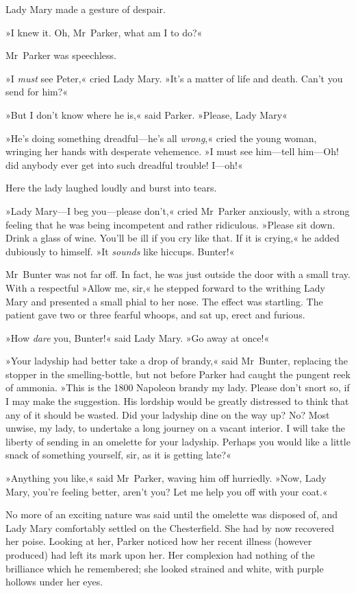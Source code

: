 Lady Mary made a gesture of despair.

»I knew it. Oh, Mr~Parker, what am I to do?«

Mr~Parker was speechless.

»I \textit{must} see Peter,« cried Lady Mary. »It's a matter of life and death. Can't you send for him?«

»But I don't know where he is,« said Parker. »Please, Lady Mary\longdash«

»He's doing something dreadful—he's all \textit{wrong},« cried the young woman, wringing her hands with desperate vehemence. »I must see him—tell him—Oh! did anybody ever get into such dreadful trouble! I—oh!\longdash«

Here the lady laughed loudly and burst into tears.

»Lady Mary—I beg you—please don't,« cried Mr~Parker anxiously, with a strong feeling that he was being incompetent and rather ridiculous.  »Please sit down. Drink a glass of wine. You'll be ill if you cry like that. If it is crying,« he added dubiously to himself. »It \textit{sounds} like hiccups. Bunter!«

Mr~Bunter was not far off. In fact, he was just outside the door with a small tray. With a respectful »Allow me, sir,« he stepped forward to the writhing Lady Mary and presented a small phial to her nose. The effect was startling. The patient gave two or three fearful whoops, and sat up, erect and furious.

»How \textit{dare} you, Bunter!« said Lady Mary. »Go away at once!«

»Your ladyship had better take a drop of brandy,« said Mr~Bunter, replacing the stopper in the smelling-bottle, but not before Parker had caught the pungent reek of ammonia. »This is the 1800 Napoleon brandy my lady. Please don't snort so, if I may make the suggestion.  His lordship would be greatly distressed to think that any of it should be wasted. Did your ladyship dine on the way up? No? Most unwise, my lady, to undertake a long journey on a vacant interior. I will take the liberty of sending in an omelette for your ladyship. Perhaps you would like a little snack of something yourself, sir, as it is getting late?«

»Anything you like,« said Mr~Parker, waving him off hurriedly. »Now, Lady Mary, you're feeling better, aren't you? Let me help you off with your coat.«

No more of an exciting nature was said until the omelette was disposed of, and Lady Mary comfortably settled on the Chesterfield. She had by now recovered her poise. Looking at her, Parker noticed how her recent illness (however produced) had left its mark upon her. Her complexion had nothing of the brilliance which he remembered; she looked strained and white, with purple hollows under her eyes.

